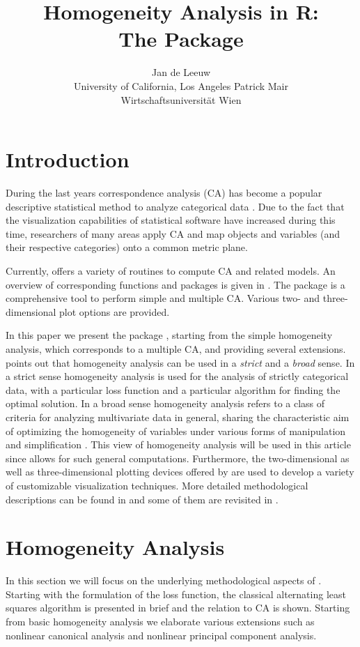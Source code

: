 \documentclass[article]{Z}
\author{Jan de Leeuw\\University of California, Los Angeles \And 
        Patrick Mair \\Wirtschaftsuniversit\"at Wien}
\title{Homogeneity Analysis in R:\\ The Package \pkg{homals}}
\begin{document}
\section{Introduction}
\label{sec:int}
During the last years correspondence analysis (CA) has become a popular descriptive statistical method to analyze categorical data \citep{Benzecri:73, Greenacre:84, Gifi:90, Greenacre+Blasius:06}. Due to the fact that the visualization capabilities of statistical software have increased during this time, researchers of many areas apply CA and map objects and variables (and their respective categories) onto a common metric plane. 
   
Currently,  \citep{R:07} offers a variety of routines to compute CA and related models. An overview of corresponding functions and packages is given in \citet{Mair+Hatzinger:07}. The package  \citep{Nenadic+Greenacre:06} is a comprehensive tool to perform simple and multiple CA. Various two- and three-dimensional plot options are provided.  

In this paper we present the  package , starting from the simple homogeneity analysis, which corresponds to a multiple CA, and providing several extensions. \citet{Gifi:90} points out that homogeneity analysis can be used in a \emph{strict} and a \emph{broad} sense. In a strict sense homogeneity analysis is used for the analysis of strictly categorical data, with a particular loss function and a particular algorithm for finding the optimal solution. In a broad sense homogeneity analysis refers to a class of criteria for analyzing multivariate data in general, sharing the characteristic aim of optimizing the homogeneity of variables under various forms of manipulation and simplification \citep[p.81]{Gifi:90}. This view of homogeneity analysis will be used in this article since  allows for such general computations. Furthermore, the two-dimensional as well as three-dimensional plotting devices offered by  are used to develop a variety of customizable visualization techniques.    
More detailed methodological descriptions can be found in \citet{Gifi:90} and some of them are revisited in \citet{Michailidis+deLeeuw:98}. 


\section{Homogeneity Analysis}
In this section we will focus on the underlying methodological aspects of . Starting with the formulation of the loss function, the classical alternating least squares algorithm is presented in brief and the relation to CA is shown. Starting from basic homogeneity analysis we elaborate various extensions such as nonlinear canonical analysis and nonlinear principal component analysis. 
\end{document}
